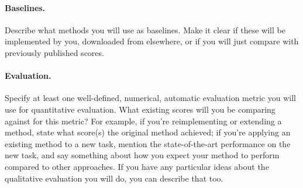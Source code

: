 \documentclass{article}
\begin{document}
\paragraph{Baselines.}
Describe what methods you will use as baselines. Make it clear if these will be implemented by you, downloaded from elsewhere, or if you will just compare with previously published scores.

\paragraph{Evaluation.}
Specify at least one well-defined, numerical, automatic evaluation metric you will use for quantitative evaluation. 
What existing scores will you be comparing against for this metric? For example, if you're reimplementing or extending a method, state what score(s) the original method achieved; if you're applying an existing method to a new task, mention the state-of-the-art performance on the new task, and say something about how you expect your method to perform compared to other approaches.
If you have any particular ideas about the qualitative evaluation you will do, you can describe that too.



\end{document}
